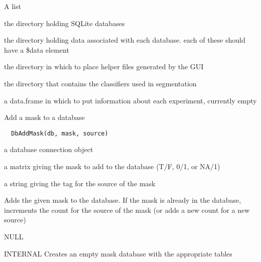 \documentclass[a4paper]{book}
\begin{document}
\begin{Value}
A list \begin{ldescription}
\item[\code{db.directory}] the directory holding SQLite
databases\item[\code{data.directory}] the directory holding
data associated with each database.  each of these should
have a \bsl{}\$data element\item[\code{helper.directory}] the
directory in which to place helper files generated by the
GUI\item[\code{classifier.direcoty}] the directory that
contains the classifiers used in segmentation
\item[\code{expdf}] a data.frame in which to put information
about each experiment, currently empty
\end{ldescription}
\end{Value}
%
\begin{Description}\relax
Add a mask to a database
\end{Description}
%
\begin{Usage}
\begin{verbatim}
  DbAddMask(db, mask, source)
\end{verbatim}
\end{Usage}
%
\begin{Arguments}
\begin{ldescription}
\item[\code{db}] a database connection object

\item[\code{mask}] a matrix giving the mask to add to the
database (T/F, 0/1, or NA/1)

\item[\code{source}] a string giving the tag for the source of
the mask
\end{ldescription}
\end{Arguments}
%
\begin{Details}\relax
Adds the given mask to the database.  If the mask is
already in the database, increments the count for the
source of the mask (or adds a new count for a new source)
\end{Details}
%
\begin{Value}
NULL
\end{Value}
%
\begin{Description}\relax
INTERNAL Creates an empty mask database with the
appropriate tables
\end{Description}
\end{document}
